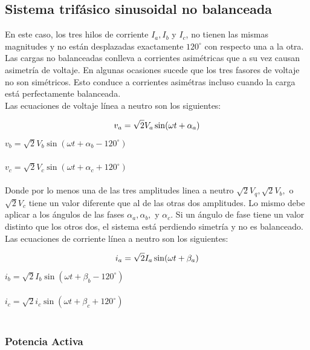 \subsection{Sistema trifásico sinusoidal no balanceada}

En este caso, los tres hilos de corriente \textbf{$I_{a},I_{b}$} y \textbf{$I_{c}$}, no tienen las mismas magnitudes y no están desplazadas exactamente $120^{\circ}$ con respecto una a la otra. Las cargas no balanceadas  conlleva a corrientes asimétricas que a su vez causan asimetría de voltaje. En algunas ocasiones sucede que los tres fasores de voltaje no son simétricos. Esto conduce a corrientes asimétras incluso cuando la carga está perfectamente balanceada.\cite{A30}\\


Las ecuaciones de voltaje línea a neutro son los siguientes:

\begin{equation}\label{EQ41}
v_{a}=\sqrt{2}V_{a}\sin(\omega t+\alpha_{a})\\
\end{equation}
$v_{b}=\sqrt{2}V_{b}\sin(\omega t+\alpha_{b} -120^{\circ})$\\\\
$v_{c}=\sqrt{2}V_{c}\sin(\omega t+\alpha_{c}+120^{\circ})$\\\\
Donde por lo menos una de las tres amplitudes linea a neutro $\sqrt{2}V_{q},\sqrt{2}V_{b},$ o $\sqrt{2}V_{c}$ tiene un valor diferente que al de las otras dos amplitudes. Lo mismo debe aplicar a los ángulos de las fases $\alpha_{a}, \alpha_{b},$ y $\alpha_{c}$. Si un ángulo de fase tiene un valor distinto que los otros dos, el sistema está perdiendo simetría y no es balanceado.\cite{A30}\\


Las ecuaciones de corriente línea a neutro son los siguientes:

\begin{equation}\label{EQ41}
i_{a}=\sqrt{2}I_{a}\sin(\omega t+\beta_{a})\\
\end{equation}
$i_{b}=\sqrt{2}I_{b}\sin(\omega t+\beta_{b} -120^{\circ})$\\\\
$i_{c}=\sqrt{2}i_{c}\sin(\omega t+\beta_{c}+120^{\circ})$\\\\

\subsubsection{Potencia Activa}

